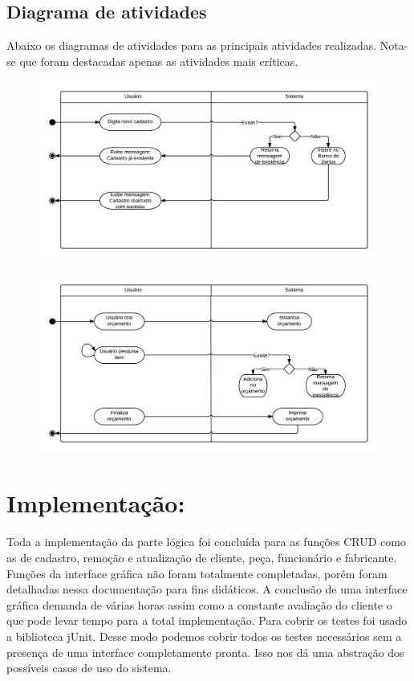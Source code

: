 \documentclass[a4paper,10pt]{article}
\begin{document}
\subsection{Diagrama de atividades}

Abaixo os diagramas de atividades para as principais atividades realizadas. Nota-se que foram destacadas apenas as atividades mais críticas.

\begin{figure}[H]
\centering
\includegraphics[width=1\textwidth]{pic/atividades_1.png}
\end{figure}

\begin{figure}[H]
\centering
\includegraphics[width=1\textwidth]{pic/atividades_2.png}
\end{figure}

\section{Implementação:}


Toda a implementação da parte lógica foi concluída para as funções CRUD como as de cadastro, remoção e atualização de cliente, peça, funcionário e fabricante. Funções da interface gráfica não foram totalmente completadas, porém foram detalhadas nessa documentação para fins didáticos. A conclusão de uma interface gráfica demanda de várias horas assim como a constante avaliação do cliente o que pode levar tempo para a total implementação. Para cobrir os testes foi usado a biblioteca jUnit. Desse modo podemos cobrir todos os testes necessários sem a presença de uma interface completamente pronta. Isso nos dá uma abstração dos possíveis casos de uso do sistema.
\end{document}
